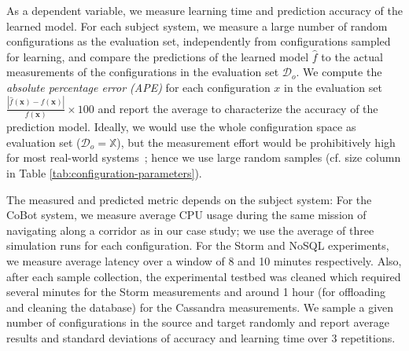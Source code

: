 As a dependent variable, we measure learning time and prediction accuracy of the learned model.
For each subject system, we measure a large number of random configurations
as the evaluation set, independently from configurations sampled for learning,
and compare the predictions
of the learned model $\hat{f}$ to the actual measurements of the configurations in the evaluation
set $\mathcal{D}_o$. We compute the \emph{absolute percentage error (APE)}
for each configuration $x$ in the evaluation set $\frac{|\hat{f}(\mathbf{x})-f(\mathbf{x})|}{f(\mathbf{x})}\times 100$
and report the average to characterize the accuracy of the prediction model.
Ideally, we would use the whole configuration space as evaluation set ($\mathcal{D}_o=\mathbb{X}$), but the measurement effort would be prohibitively high for most real-world systems~\cite{jamshidi2016bo4co,influence}; hence we use large random samples (cf. size column in Table \ref{tab:configuration-parameters}).

The measured and predicted metric depends on the subject system:
For the CoBot system, we measure average CPU usage during the same mission of navigating along a corridor as in our case study;
we use the average of three simulation runs for each configuration.
For the Storm and NoSQL experiments, we measure average latency over a window of 8 and 10 minutes respectively.
Also, after each sample collection, the experimental testbed was cleaned which required several minutes for the Storm measurements and around 1 hour (for offloading and cleaning the database) for the Cassandra measurements.
We sample a given number of configurations in the source and target
randomly and report average results and standard deviations
of accuracy and learning time over 3 repetitions.








